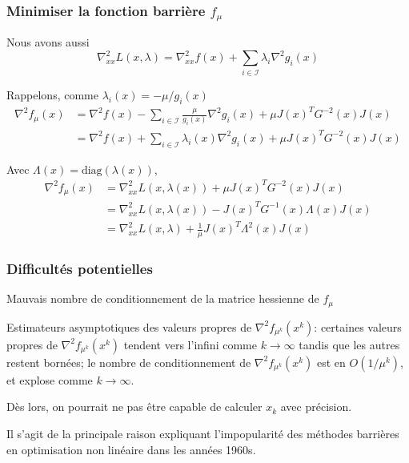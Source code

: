 \documentclass[usepdftitle=false]{beamer}
\def\cI{\mathcal{I}}
\begin{document}
\begin{frame}
\frametitle{Minimiser la fonction barrière $f_{\mu}$}

Nous avons aussi
$$
\nabla^2_{xx} L(x,\lambda) = \nabla^2_{xx} f(x)+\sum_{i \in \cI} \lambda_i \nabla^2 g_i(x)
$$

\mbox{}
Rappelons, comme $\lambda_i(x) = -\mu/g_i(x)$
\begin{align*}
\nabla^2 f_{\mu}(x)
&= \nabla^2 f(x) - \sum_{i \in \cI} \frac{\mu}{g_i(x)} \nabla^2 g_i(x) + \mu J(x)^T G^{-2}(x)J(x) \\
&= \nabla^2 f(x) + \sum_{i \in \cI} \lambda_i(x) \nabla^2 g_i(x) + \mu J(x)^T G^{-2}(x)J(x)
\end{align*}

Avec $\Lambda(x) = \mbox{diag}(\lambda(x))$,
\begin{align*}
\nabla^2 f_{\mu}(x)
& = \nabla^2_{xx} L(x,\lambda(x)) + \mu J(x)^T G^{-2}(x) J(x) \\
& = \nabla^2_{xx} L(x,\lambda(x)) - J(x)^T G^{-1}(x) \Lambda(x) J(x) \\
& = \nabla^2_{xx} L(x,\lambda) + \frac{1}{\mu} J(x)^T \Lambda^{2}(x) J(x)
\end{align*}

\end{frame}

\begin{frame}
\frametitle{Difficultés potentielles}

Mauvais nombre de conditionnement de la matrice hessienne de $f_{\mu}$

\mbox{}

Estimateurs asymptotiques des valeurs propres de $\nabla^2 f_{\mu^k}(x^k)$:
certaines valeurs propres de $\nabla^2 f_{\mu^k}(x^k)$ tendent vers l'infini comme $k \rightarrow \infty$ tandis que les autres restent bornées; le nombre de conditionnement de $\nabla^2 f_{\mu^k}(x^k)$ est en $O(1/\mu^k)$, et explose comme $k \rightarrow \infty$.

\mbox{}

Dès lors, on pourrait ne pas être capable de calculer $x_k$ avec précision.

Il s'agit de la principale raison expliquant l'impopularité des méthodes barrières en optimisation non linéaire dans les années 1960s.

\end{frame}
\end{document}
